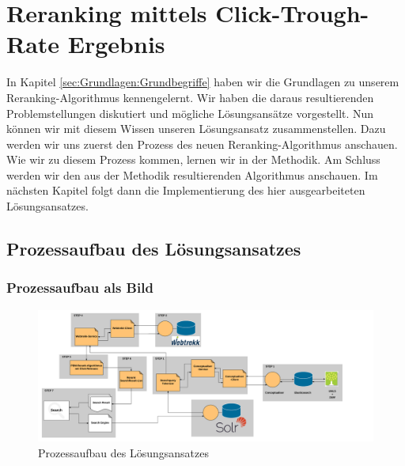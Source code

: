 %
\chapter{Reranking mittels Click-Trough-Rate Ergebnis}
\label{sec:Reranking}

In Kapitel \ref{sec:Grundlagen:Grundbegriffe} haben wir die Grundlagen zu unserem Reranking-Algorithmus kennengelernt. Wir haben die daraus resultierenden Problemstellungen diskutiert und mögliche Lösungsansätze vorgestellt. Nun können wir mit diesem Wissen unseren Lösungsansatz zusammenstellen. Dazu werden wir uns zuerst den Prozess des neuen Reranking-Algorithmus anschauen. Wie wir zu diesem Prozess kommen, lernen wir in der Methodik. Am Schluss werden wir den aus der Methodik resultierenden Algorithmus anschauen. Im nächsten Kapitel folgt dann die Implementierung des hier ausgearbeiteten Lösungsansatzes.


\section{Prozessaufbau des Lösungsansatzes}
\label{sec:Reranking:Prozessaufbau}

\subsection{Prozessaufbau als Bild}
\label{sec:Reranking:Prozessaufbau:ProzessaufbauBild}

\begin{figure}[H]
\centering
\vspace{-1em}
\caption[Prozessaufbau des Lösungsansatzes]{Prozessaufbau des Lösungsansatzes}
\label{fig:Prozessaufbau}
\includegraphics[width=0.5\linewidth]{gfx/Prozessaufbau}
\vspace{-2em}
\end{figure}
		

